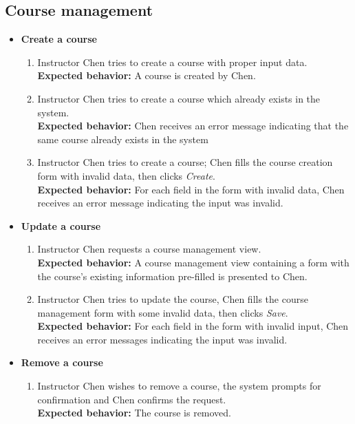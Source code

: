 \subsection{Course management}
\begin{itemize}
    \item \textbf{Create a course} \begin{enumerate}
        \item Instructor Chen tries to create a course with proper input data. \\
        {\bf Expected behavior:} A course is created by Chen.

        \item Instructor Chen tries to create a course which 
            already exists in the system. \\
        {\bf Expected behavior:} Chen receives an error message indicating that
            the same course already exists in the system

        \item Instructor Chen tries to create a course; Chen fills the
            course creation form with invalid data, then clicks \emph{Create}. \\
        {\bf Expected behavior:} For each field in the form with invalid data,
            Chen receives an error message indicating the input was invalid.
    \end{enumerate}

    \item \textbf{Update a course} \begin{enumerate}
        \item Instructor Chen requests a course management view. \\
        {\bf Expected behavior:} A course management view containing a form
            with the course's existing information pre-filled is presented
            to Chen.

        \item Instructor Chen tries to update the course, Chen fills the course
            management form with some invalid data, then clicks \emph{Save}. \\
        {\bf Expected behavior:} For each field in the form with invalid input,
            Chen receives an error messages indicating the input was
            invalid.
    \end{enumerate}

    \item \textbf{Remove a course} \begin{enumerate}
        \item Instructor Chen wishes to remove a course, the system prompts
            for confirmation and Chen confirms the request. \\
        {\bf Expected behavior:} The course is removed.
    \end{enumerate}


\end{itemize}
